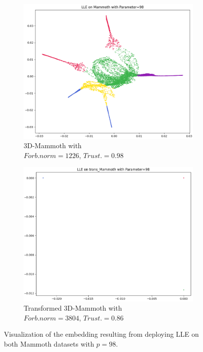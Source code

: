 \begin{figure}[!]
     \centering
     \begin{subfigure}[t]{0.49\columnwidth}
    	\centering
    	\includegraphics[width=\columnwidth]{images/LOW_Mammoth_lle_98.png}
    	\caption{3D-Mammoth with \\ $Forb.norm=1226$, $Trust.=0.98$}
        \label{fig:LOW_Mammoth_lle_98}
    \end{subfigure}
     \hfill
     \begin{subfigure}[t]{0.49\columnwidth}
    	\centering
    	\includegraphics[width=\columnwidth]{images/LOW_trans_Mammoth_lle_98.png}
    	\caption{Transformed 3D-Mammoth  with \\ $Forb.norm=3804$, $Trust.=0.86$}
        \label{fig:LOW_trans_Mammoth_lle_98}
    \end{subfigure}
     \caption[3D-Mammoth vs. Transformed 3D-Mammoth Visualization]{Visualization of the embedding resulting from deploying LLE on both Mammoth datasets with $p=98$.}
    \label{fig:mamm_vs_trans_98}
\end{figure}

